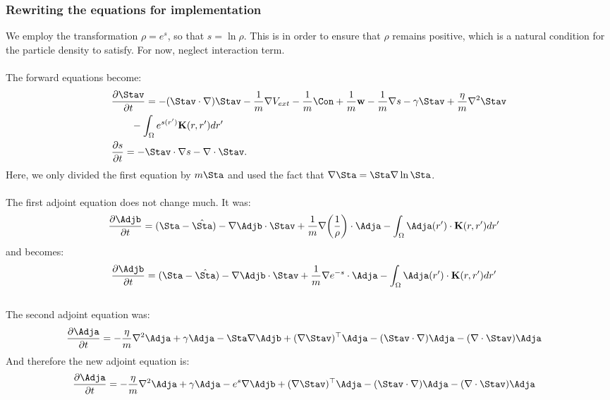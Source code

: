 \subsubsection{Rewriting the equations for implementation}
We employ the transformation $\rho = e^s$, so that $s = \ln \rho$. This is in order to ensure that $\rho$ remains positive, which is a natural condition for the particle density to satisfy. For now, neglect interaction term.
\\
\\
The forward equations become:
\begin{align}
& \frac{\partial \Stav}{\partial t}= -  (\Stav \cdot \nabla)\Stav - \frac{1}{m} \nabla V_{ext} -\frac{1}{m}\Con +\frac{1}{m} \mathbf{w} - \frac{1}{m} \nabla s - \gamma \Stav +  \frac{\eta}{m} \nabla^2 \Stav \label{eqn:INreducedv1}\\
&\quad \quad  -\int_\Omega e^{s(r')} \mathbf{K}(r,r')dr'\\
 &\frac{\partial s}{\partial t} = - \Stav \cdot \nabla s - \nabla \cdot \Stav \label{eqn:INreducedrho1} .
\end{align}
Here, we only divided the first equation by $m \Sta$ and used the fact that $\nabla \Sta = \Sta \nabla \ln \Sta$.\\
\\
The first adjoint equation does not change much. It was: 
\begin{align*}
&  \frac{\partial \Adjb}{\partial t}  = (\Sta - \hat \Sta)- \nabla \Adjb \cdot \Stav +\frac{1}{m}\nabla \bigg(\frac{1}{\rho}\bigg)\cdot \Adja -  \int_\Omega  \Adja(r') \cdot\mathbf{K}(r,r')   dr' 
\end{align*}
and becomes:
\begin{align*}
&  \frac{\partial \Adjb}{\partial t}  = (\Sta - \hat \Sta)- \nabla \Adjb \cdot \Stav +\frac{1}{m}\nabla e^{-s}\cdot \Adja -  \int_\Omega  \Adja(r') \cdot\mathbf{K}(r,r')   dr' 
\end{align*}
\\
The second adjoint equation was:
\begin{align*}
&\frac{\partial \Adja}{\partial t} =  - \frac{\eta}{m} \nabla^2 \Adja  + \gamma\Adja-\Sta\nabla \Adjb +(\nabla \Stav)^\top\Adja 
- (\Stav \cdot \nabla)\Adja -  (\nabla \cdot \Stav)\Adja   
\end{align*}
And therefore the new adjoint equation is:
\begin{align*}
&\frac{\partial \Adja}{\partial t} =  - \frac{\eta}{m} \nabla^2 \Adja  + \gamma\Adja-e^s\nabla \Adjb +(\nabla \Stav)^\top\Adja 
- (\Stav \cdot \nabla)\Adja -  (\nabla \cdot \Stav)\Adja   
\end{align*}

